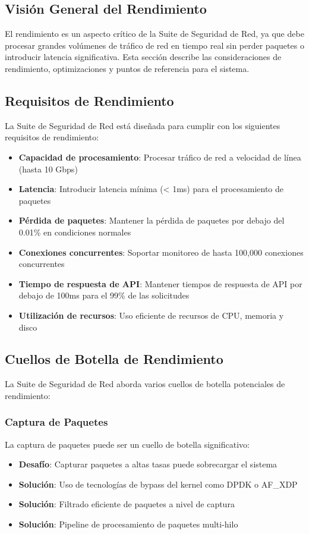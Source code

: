 \subsection{Visión General del Rendimiento}
El rendimiento es un aspecto crítico de la Suite de Seguridad de Red, ya que debe procesar grandes volúmenes de tráfico de red en tiempo real sin perder paquetes o introducir latencia significativa. Esta sección describe las consideraciones de rendimiento, optimizaciones y puntos de referencia para el sistema.

\subsection{Requisitos de Rendimiento}
La Suite de Seguridad de Red está diseñada para cumplir con los siguientes requisitos de rendimiento:

\begin{itemize}
    \item \textbf{Capacidad de procesamiento}: Procesar tráfico de red a velocidad de línea (hasta 10 Gbps)
    \item \textbf{Latencia}: Introducir latencia mínima (< 1ms) para el procesamiento de paquetes
    \item \textbf{Pérdida de paquetes}: Mantener la pérdida de paquetes por debajo del 0.01\% en condiciones normales
    \item \textbf{Conexiones concurrentes}: Soportar monitoreo de hasta 100,000 conexiones concurrentes
    \item \textbf{Tiempo de respuesta de API}: Mantener tiempos de respuesta de API por debajo de 100ms para el 99\% de las solicitudes
    \item \textbf{Utilización de recursos}: Uso eficiente de recursos de CPU, memoria y disco
\end{itemize}

\subsection{Cuellos de Botella de Rendimiento}
La Suite de Seguridad de Red aborda varios cuellos de botella potenciales de rendimiento:

\subsubsection{Captura de Paquetes}
La captura de paquetes puede ser un cuello de botella significativo:

\begin{itemize}
    \item \textbf{Desafío}: Capturar paquetes a altas tasas puede sobrecargar el sistema
    \item \textbf{Solución}: Uso de tecnologías de bypass del kernel como DPDK o AF\_XDP
    \item \textbf{Solución}: Filtrado eficiente de paquetes a nivel de captura
    \item \textbf{Solución}: Pipeline de procesamiento de paquetes multi-hilo
\end{itemize}

